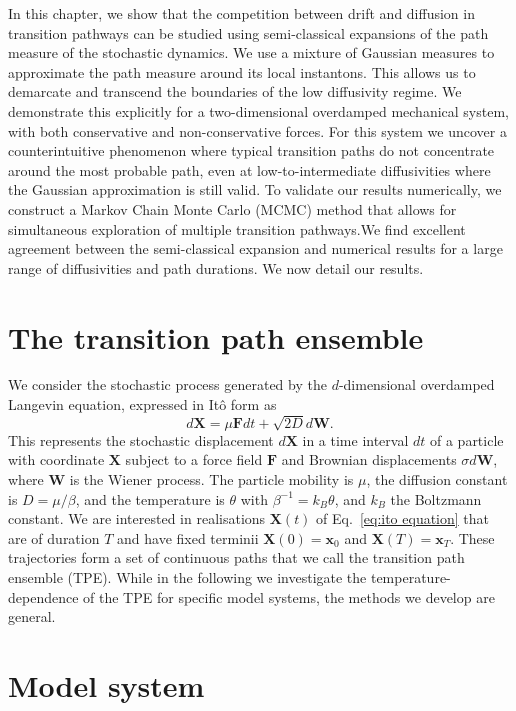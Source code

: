 In this chapter, we show that the competition between drift and diffusion
in transition pathways can be studied using semi-classical expansions
of the path measure of the stochastic dynamics. We use a mixture of
Gaussian measures to approximate the path measure around its local
instantons. This allows us to demarcate and transcend the boundaries
of the low diffusivity regime. We demonstrate this explicitly for
a two-dimensional overdamped mechanical system, with both conservative
and non-conservative forces. For this system we uncover a counterintuitive
phenomenon where typical transition paths do not concentrate around
the most probable path, even at low-to-intermediate diffusivities
where the Gaussian approximation is still valid. To validate our results
numerically, we construct a Markov Chain Monte Carlo (MCMC) method
that allows for simultaneous exploration of multiple transition pathways.We
find excellent agreement between the semi-classical expansion and
numerical results for a large range of diffusivities and path durations.
We now detail our results.


\section{The transition path ensemble}

We consider the stochastic process
generated by the $d$-dimensional overdamped Langevin equation, expressed
in Itô form as
\begin{equation}
d\mathbf{X}=\mu\mathbf{F}dt+\sqrt{2D}d\mathbf{W}.\label{eq:ito equation}
\end{equation}
This represents the stochastic displacement $d\mathbf{X}$ in a time
interval $dt$ of a particle with coordinate $\mathbf{X}$ subject
to a force field $\mathbf{F}$ and Brownian displacements $\sigma d\mathbf{W}$,
where $\mathbf{W}$ is the Wiener process. The particle mobility is
$\mu$, the diffusion constant is $D=\mu/\beta$, and the temperature
is $\theta$ with $\beta^{-1}=k_{B}\theta$, and $k_{B}$ the Boltzmann
constant. We are interested in realisations $\mathbf{X}(t)$ of Eq.~\eqref{eq:ito equation}
that are of duration $T$ and have fixed terminii $\mathbf{X}(0)=\mathbf{x}_{0}$
and $\mathbf{X}(T)=\mathbf{x}_{T}$. These trajectories form a set
of continuous paths that we call the transition path ensemble (TPE).
While in the following we investigate the temperature-dependence of
the TPE for specific model systems, the methods we develop are general.

\section{Model system}


